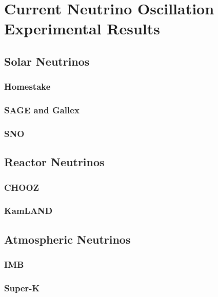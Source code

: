 
\chapter{Current Neutrino Oscillation Experimental Results}
\label{current_results_chapter}

\section{Solar Neutrinos}

\subsection{Homestake}

\subsection{SAGE and Gallex}

\subsection{SNO}

\section{Reactor Neutrinos}

\subsection{CHOOZ}

\subsection{KamLAND}

\section{Atmospheric Neutrinos}

\subsection{IMB}

\subsection{Super-K}

